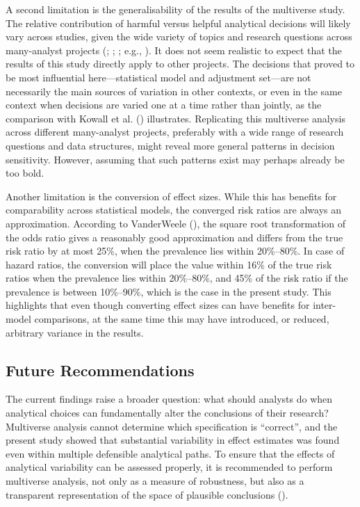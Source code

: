 \documentclass[
  man,
  floatsintext,
  longtable,
  nolmodern,
  notxfonts,
  notimes,
  colorlinks=true,linkcolor=blue,citecolor=blue,urlcolor=blue]{apa7}
\begin{document}
A second limitation is the generalisability of the results of the
multiverse study. The relative contribution of harmful versus helpful
analytical decisions will likely vary across studies, given the wide
variety of topics and research questions across many-analyst projects
(;
;
; e.g.,
). It does
not seem realistic to expect that the results of this study directly
apply to other projects. The decisions that proved to be most
influential here---statistical model and adjustment set---are not
necessarily the main sources of variation in other contexts, or even in
the same context when decisions are varied one at a time rather than
jointly, as the comparison with Kowall et al.
() illustrates. Replicating this
multiverse analysis across different many-analyst projects, preferably
with a wide range of research questions and data structures, might
reveal more general patterns in decision sensitivity. However, assuming
that such patterns exist may perhaps already be too bold.

Another limitation is the conversion of effect sizes. While this has
benefits for comparability across statistical models, the converged risk
ratios are always an approximation. According to VanderWeele
(), the square root
transformation of the odds ratio gives a reasonably good approximation
and differs from the true risk ratio by at most 25\%, when the
prevalence lies within 20\%--80\%. In case of hazard ratios, the
conversion will place the value within 16\% of the true risk ratios when
the prevalence lies within 20\%--80\%, and 45\% of the risk ratio if the
prevalence is between 10\%--90\%, which is the case in the present
study. This highlights that even though converting effect sizes can have
benefits for inter-model comparisons, at the same time this may have
introduced, or reduced, arbitrary variance in the results.

\subsection{Future Recommendations}\label{future-recommendations}

The current findings raise a broader question: what should analysts do
when analytical choices can fundamentally alter the conclusions of their
research? Multiverse analysis cannot determine which specification is
``correct'', and the present study showed that substantial variability
in effect estimates was found even within multiple defensible analytical
paths. To ensure that the effects of analytical variability can be
assessed properly, it is recommended to perform multiverse analysis, not
only as a measure of robustness, but also as a transparent
representation of the space of plausible conclusions
().
\end{document}

